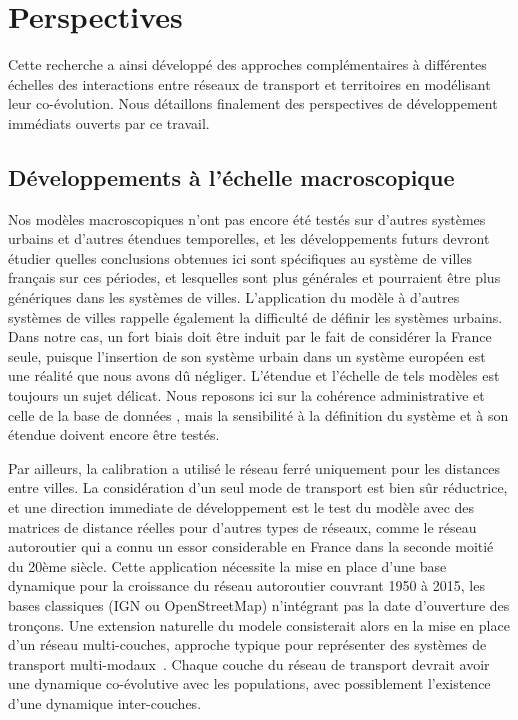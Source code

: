 \documentclass[11pt]{article}
\begin{document}
\section{Perspectives}

Cette recherche a ainsi développé des approches complémentaires à différentes échelles des interactions entre réseaux de transport et territoires en modélisant leur co-évolution. Nous détaillons finalement des perspectives de développement immédiats ouverts par ce travail.


\subsection{Développements à l'échelle macroscopique}

Nos modèles macroscopiques n'ont pas encore été testés sur d'autres systèmes urbains et d'autres étendues temporelles, et les développements futurs devront étudier quelles conclusions obtenues ici sont spécifiques au système de villes français sur ces périodes, et lesquelles sont plus générales et pourraient être plus génériques dans les systèmes de villes. L'application du modèle à d'autres systèmes de villes rappelle également la difficulté de définir les systèmes urbains. Dans notre cas, un fort biais doit être induit par le fait de considérer la France seule, puisque l'insertion de son système urbain dans un système européen est une réalité que nous avons dû négliger. L'étendue et l'échelle de tels modèles est toujours un sujet délicat. Nous reposons ici sur la cohérence administrative et celle de la base de données \citep{pumain1986fichier}, mais la sensibilité à la définition du système et à son étendue doivent encore être testés.

Par ailleurs, la calibration a utilisé le réseau ferré uniquement pour les distances entre villes. La considération d'un seul mode de transport est bien sûr réductrice, et une direction immediate de développement est le test du modèle avec des matrices de distance réelles pour d'autres types de réseaux, comme le réseau autoroutier qui a connu un essor considerable en France dans la seconde moitié du 20ème siècle. Cette application nécessite la mise en place d'une base dynamique pour la croissance du réseau autoroutier couvrant 1950 à 2015, les bases classiques (IGN ou OpenStreetMap) n'intégrant pas la date d'ouverture des tronçons. Une extension naturelle du modele consisterait alors en la mise en place d'un réseau multi-couches, approche typique pour représenter des systèmes de transport multi-modaux~\citep{gallotti2014anatomy}. Chaque couche du réseau de transport devrait avoir une dynamique co-évolutive avec les populations, avec possiblement l'existence d'une dynamique inter-couches.
\end{document}
